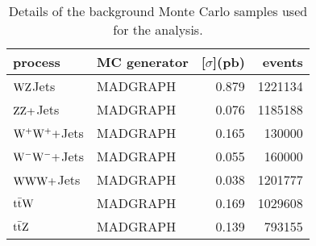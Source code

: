 \begin{table}[htb]
\small{
    \centering
\begin{tabular}{llrr}
    \toprule
process & MC generator & \unit[$\sigma$]{(pb)} & events \\
\midrule
$\mathrm{W}\mathrm{Z}$Jets                                          & MADGRAPH & 0.879 & 1221134  \\
$\mathrm{Z}\mathrm{Z}+$Jets                                          & MADGRAPH & 0.076 & 1185188  \\
$\mathrm{W}^{+}\mathrm{W}^{+}+$Jets                                  & MADGRAPH & 0.165        & 130000    \\
$\mathrm{W}^{-}\mathrm{W}^{-}+$Jets                                  & MADGRAPH & 0.055        & 160000    \\
$\mathrm{W}\mathrm{W}\mathrm{W}+$Jets                                       & MADGRAPH & 0.038        & 1201777  \\
$\mathrm{t}\bar{\mathrm{t}} \mathrm{W}$                                         & MADGRAPH & 0.169 & 1029608  \\
$\mathrm{t}\bar{\mathrm{t}} \mathrm{Z}$                                         & MADGRAPH & 0.139        & 793155    \\
\bottomrule
\end{tabular}
}
\caption{Details of the background Monte Carlo samples used for the analysis.}
\label{tab:background_mc}
\end{table}
